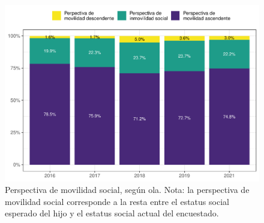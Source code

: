 \documentclass[
  12pt,
]{book}
\begin{document}
\begin{figure}

{\centering \includegraphics{reporte-elsoc_files/figure-latex/mov-soc-rec-1} 

}

\caption{Perspectiva de movilidad social, según ola.
Nota: la perspectiva de movilidad social corresponde a la resta entre el estatus social esperado del hijo y el estatus social actual del encuestado.}\label{fig:mov-soc-rec}
\end{figure}
\end{document}
